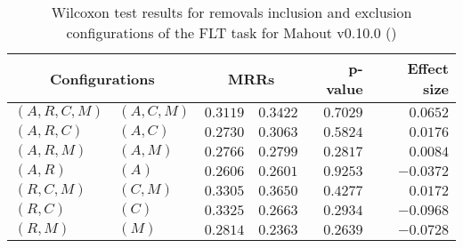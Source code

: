 
\begin{table}
\begin{spacing}{1.2}
\centering
\caption{Wilcoxon test results for removals inclusion and exclusion configurations of the FLT task for Mahout v0.10.0 (\ctwo)}
\label{table:versus-wilcox-mahout-flt-removals}
\begin{tabular}{ll|rr|rr}
\toprule
      \multicolumn{2}{c|}{Configurations} &                \multicolumn{2}{c|}{MRRs} &             p-value & Effect size \\
\midrule
 $(A,R,C,M)$ &  $(A,C,M)$ &       $0.3119$ &  $\bm{0.3422}$ & $0.7029$ &    $0.0652$ \\
   $(A,R,C)$ &    $(A,C)$ &       $0.2730$ &  $\bm{0.3063}$ & $0.5824$ &    $0.0176$ \\
   $(A,R,M)$ &    $(A,M)$ &       $0.2766$ &  $\bm{0.2799}$ & $0.2817$ &    $0.0084$ \\
     $(A,R)$ &      $(A)$ &  $\bm{0.2606}$ &       $0.2601$ & $0.9253$ &   $-0.0372$ \\
   $(R,C,M)$ &    $(C,M)$ &       $0.3305$ &  $\bm{0.3650}$ & $0.4277$ &    $0.0172$ \\
     $(R,C)$ &      $(C)$ &  $\bm{0.3325}$ &       $0.2663$ & $0.2934$ &   $-0.0968$ \\
     $(R,M)$ &      $(M)$ &  $\bm{0.2814}$ &       $0.2363$ & $0.2639$ &   $-0.0728$ \\
\bottomrule
\end{tabular}

\end{spacing}
\end{table}

